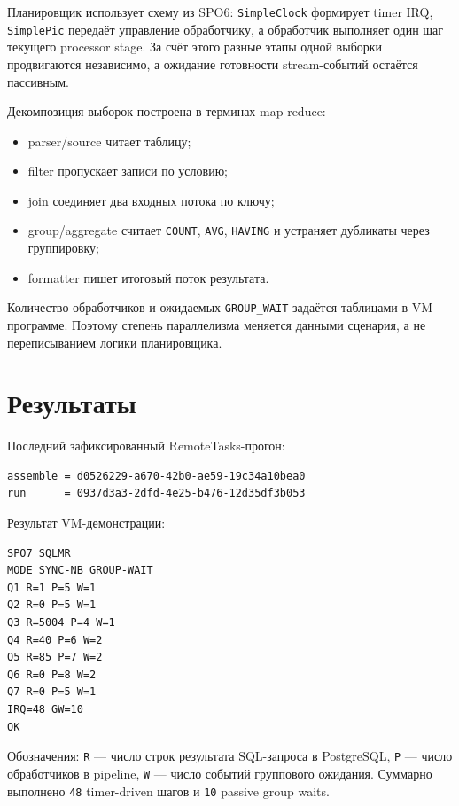 \documentclass[a4paper,12pt]{article}
\begin{document}
Планировщик использует схему из SPO6: \texttt{SimpleClock} формирует timer IRQ, \texttt{SimplePic} передаёт управление обработчику, а обработчик выполняет один шаг текущего processor stage. За счёт этого разные этапы одной выборки продвигаются независимо, а ожидание готовности stream-событий остаётся пассивным.

Декомпозиция выборок построена в терминах map-reduce:
\begin{itemize}
\item parser/source читает таблицу;
\item filter пропускает записи по условию;
\item join соединяет два входных потока по ключу;
\item group/aggregate считает \texttt{COUNT}, \texttt{AVG}, \texttt{HAVING} и устраняет дубликаты через группировку;
\item formatter пишет итоговый поток результата.
\end{itemize}

Количество обработчиков и ожидаемых \texttt{GROUP\_WAIT} задаётся таблицами в VM-программе. Поэтому степень параллелизма меняется данными сценария, а не переписыванием логики планировщика.

\section{Результаты}
Последний зафиксированный RemoteTasks-прогон:
\begin{lstlisting}
assemble = d0526229-a670-42b0-ae59-19c34a10bea0
run      = 0937d3a3-2dfd-4e25-b476-12d35df3b053
\end{lstlisting}

Результат VM-демонстрации:
\begin{lstlisting}
SPO7 SQLMR
MODE SYNC-NB GROUP-WAIT
Q1 R=1 P=5 W=1
Q2 R=0 P=5 W=1
Q3 R=5004 P=4 W=1
Q4 R=40 P=6 W=2
Q5 R=85 P=7 W=2
Q6 R=0 P=8 W=2
Q7 R=0 P=5 W=1
IRQ=48 GW=10
OK
\end{lstlisting}

Обозначения: \texttt{R} — число строк результата SQL-запроса в PostgreSQL, \texttt{P} — число обработчиков в pipeline, \texttt{W} — число событий группового ожидания. Суммарно выполнено \texttt{48} timer-driven шагов и \texttt{10} passive group waits.
\end{document}
